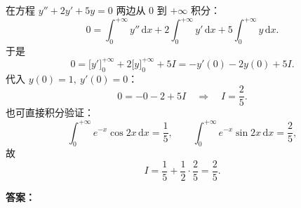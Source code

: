 在方程 $y''+2y'+5y=0$ 两边从 $0$ 到 $+\infty$ 积分：
\[
0=\int_0^{+\infty}y''\,\mathrm{d}x+2\int_0^{+\infty}y'\,\mathrm{d}x+5\int_0^{+\infty}y\,\mathrm{d}x.
\]
于是
\[
0=\bigl[y'\bigr]_0^{+\infty}+2\bigl[y\bigr]_0^{+\infty}+5I
=-y'(0)-2y(0)+5I.
\]
代入 $y(0)=1,\ y'(0)=0$：
\[
0=-0-2+5I
\quad\Longrightarrow\quad
I=\frac25.
\]
也可直接积分验证：
\[
\int_0^{+\infty}e^{-x}\cos 2x\,\mathrm{d}x=\frac15,\qquad
\int_0^{+\infty}e^{-x}\sin 2x\,\mathrm{d}x=\frac25,
\]
故
\[
I=\frac15+\frac12\cdot\frac25=\frac25.
\]

\textbf{答案：}

\else \answerarea[10] \fi%
